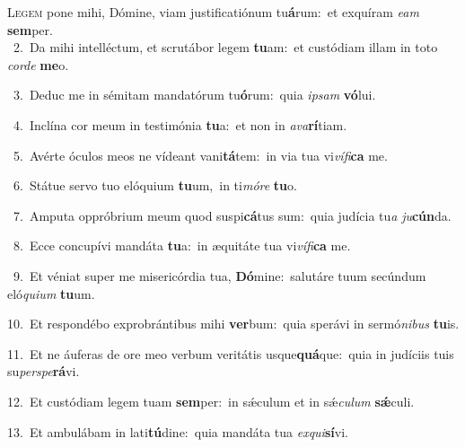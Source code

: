 \lettrine{\initial\textcolor{\initialcolor}{L}}{egem} pone mihi, Dómine, viam justificatiónum tu\-\textbf{á}\-rum:~\star et exquíram \textit{e}\-\textit{am} \textbf{sem}\-per.\\
{\numbfont\textcolor{\numbcolor}{~2.}}~Da mihi intelléctum, et scrutábor legem \textbf{tu}\-am:~\star et custódiam illam in toto \textit{cor}\-\textit{de} \textbf{me}\-o.\par
{\numbfont\textcolor{\numbcolor}{~3.}}~Deduc me in sémitam mandatórum tu\-\textbf{ó}\-rum:~\star quia \textit{ip}\-\textit{sam} \textbf{vó}\-lui.\par
{\numbfont\textcolor{\numbcolor}{~4.}}~Inclína cor meum in testimónia \textbf{tu}\-a:~\star et non in \textit{a}\-\textit{va}\textbf{rí}tiam.\par
{\numbfont\textcolor{\numbcolor}{~5.}}~Avérte óculos meos ne vídeant vani\-\textbf{tá}\-tem:~\star in via tua vi\-\textit{ví}\-\textit{fi}\textbf{ca} me.\par
{\numbfont\textcolor{\numbcolor}{~6.}}~Státue servo tuo elóquium \textbf{tu}\-um,~\star in ti\-\textit{mó}\-\textit{re} \textbf{tu}\-o.\par
{\numbfont\textcolor{\numbcolor}{~7.}}~Amputa oppróbrium meum quod suspi\-\textbf{cá}\-tus sum:~\star quia judícia tu\textit{a} \textit{ju}\-\textbf{cún}da.\par
{\numbfont\textcolor{\numbcolor}{~8.}}~Ecce concupívi mandáta \textbf{tu}\-a:~\star in æquitáte tua vi\-\textit{ví}\-\textit{fi}\textbf{ca} me.\par
{\numbfont\textcolor{\numbcolor}{~9.}}~Et véniat super me misericórdia tua, \textbf{Dó}\-mine:~\star salutáre tuum secúndum eló\-\textit{qui}\-\textit{um} \textbf{tu}\-um.\par
{\numbfont\textcolor{\numbcolor}{10.}}~Et respondébo exprobrántibus mihi \textbf{ver}\-bum:~\star quia sperávi in sermó\-\textit{ni}\-\textit{bus} \textbf{tu}\-is.\par
{\numbfont\textcolor{\numbcolor}{11.}}~Et ne áuferas de ore meo verbum veritátis usque\-\textbf{quá}\-que:~\star quia in judíciis tuis su\-\textit{per}\-\textit{spe}\textbf{rá}vi.\par
{\numbfont\textcolor{\numbcolor}{12.}}~Et custódiam legem tuam \textbf{sem}\-per:~\star in sǽculum et in sǽ\-\textit{cu}\-\textit{lum} \textbf{sǽ}\-culi.\par
{\numbfont\textcolor{\numbcolor}{13.}}~Et ambulábam in lati\-\textbf{tú}\-dine:~\star quia mandáta tua \textit{ex}\-\textit{qui}\textbf{sí}vi.\par
